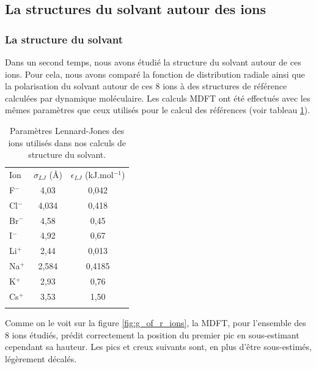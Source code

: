 \subsection{La structures du solvant autour des ions}

\subsubsection{La structure du solvant}
Dans un second temps, nous avons étudié la structure du solvant autour de ces ions. Pour cela, nous avons comparé la fonction de distribution radiale ainsi que la polarisation du solvant autour de ces 8 ions à des structures de référence calculées par dynamique moléculaire. Les calculs MDFT ont été effectués avec les mêmes paramètres que ceux utilisés pour le calcul des références (voir tableau \ref{tab:param_lj_ions_daniel}).

\begin{table}[ht]
  \centering
  \begin{tabular}{l c c}
   \hline & \\[-1em]\hline
    Ion    & $\sigma_{LJ}$ (\AA) & $\epsilon_{LJ}$ (kJ.mol$^{-1}$) \\
    \hline
      F$^-$	 & 4,03 & 0,042 \\
      Cl$^-$ & 4,034 & 0,418 \\
      Br$^-$ & 4,58 & 0,45 \\
      I$^-$  & 4,92 & 0,67 \\
      Li$^+$ & 2,44 & 0,013 \\
      Na$^+$ & 2,584 & 0,4185 \\
      K$^+$  & 2,93 & 0,76 \\
      Cs$^+$ & 3,53 & 1,50 \\
    \hline & \\[-1em]\hline
  \end{tabular}
  \caption{Paramètres Lennard-Jones des ions utilisés dans nos calculs de structure du solvant.}
  \label{tab:param_lj_ions_daniel}  
\end{table}


Comme on le voit sur la figure \ref{fig:g_of_r_ions}, la MDFT, pour l'ensemble des 8 ions étudiés, prédit correctement la position du premier pic en sous-estimant cependant sa hauteur. Les pics et creux suivants sont, en plus d'être sous-estimés, légèrement décalés.

